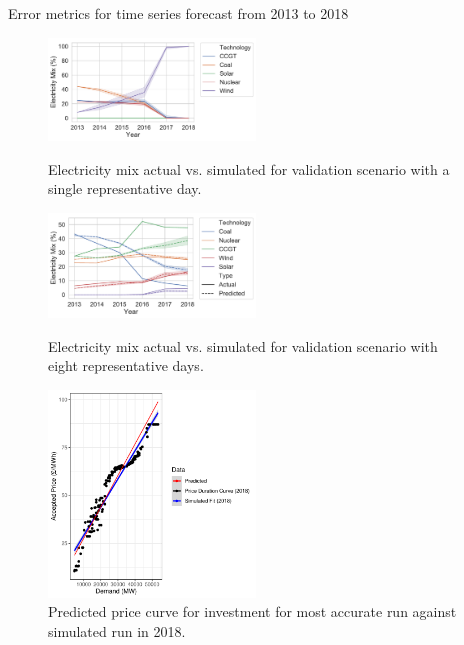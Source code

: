 \documentclass[final,3p,times,twocolumn,numbers]{elsarticle}
\begin{document}
\begin{table}[htb]
    \centering
{}
    \caption{Error metrics for time series forecast from 2013 to 2018}\label{table:metrics}
\end{table}


\begin{figure}
\centering
\includegraphics[width=0.49\textwidth]{figures/results/yearly_time_step_scenario.pdf}
\label{uk_historical_mix}
\caption{Electricity mix actual vs. simulated for validation scenario with a single representative day.}
\end{figure}


\begin{figure}
\centering
\includegraphics[width=0.49\textwidth]{figures/results/throughout_years.pdf}
\label{uk_historical_mix}
\caption{Electricity mix actual vs. simulated for validation scenario with eight representative days.}
\end{figure}

\begin{figure}
\centering
\includegraphics[width=0.49\textwidth]{figures/results/best_run_price_dur_curve.pdf}
\caption{Predicted price curve for investment for most accurate run against simulated run in 2018.}
\label{fig:best_price_curve}
\end{figure}
\end{document}
